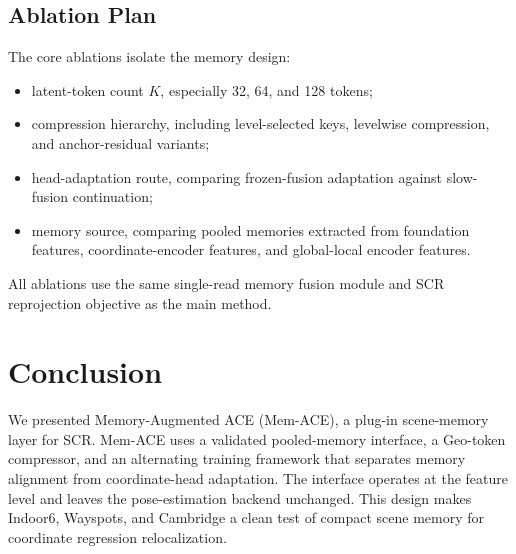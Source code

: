 \documentclass[letterpaper]{article} %
\newcommand{\method}{Memory-Augmented ACE}
\newcommand{\shortmethod}{Mem-ACE}
\newcommand{\geocomp}{Geo-token compressor}
\begin{document}
\subsection{Ablation Plan}

The core ablations isolate the memory design:
\begin{itemize}
    \item latent-token count $K$, especially 32, 64, and 128 tokens;
    \item compression hierarchy, including level-selected keys, levelwise compression, and anchor-residual variants;
    \item head-adaptation route, comparing frozen-fusion adaptation against slow-fusion continuation;
    \item memory source, comparing pooled memories extracted from foundation features, coordinate-encoder features, and global-local encoder features.
\end{itemize}
All ablations use the same single-read memory fusion module and SCR reprojection objective as the main method.

\section{Conclusion}

We presented \method{} (\shortmethod{}), a plug-in scene-memory layer for SCR. \shortmethod{} uses a validated pooled-memory interface, a \geocomp{}, and an alternating training framework that separates memory alignment from coordinate-head adaptation. The interface operates at the feature level and leaves the pose-estimation backend unchanged. This design makes Indoor6, Wayspots, and Cambridge a clean test of compact scene memory for coordinate regression relocalization.


\end{document}
